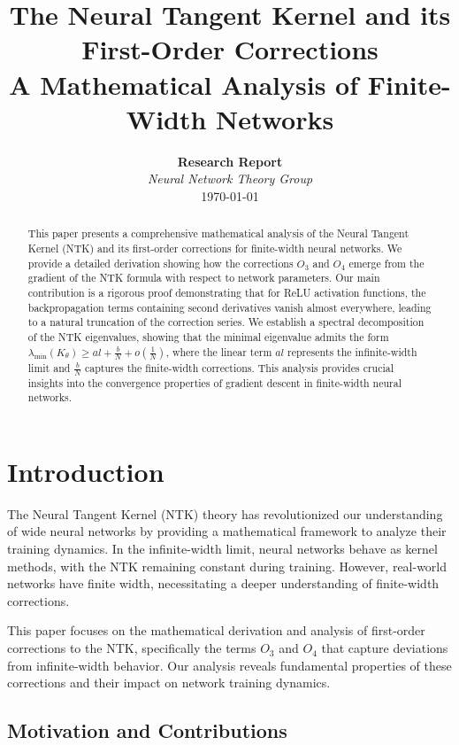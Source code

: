 \documentclass[11pt,a4paper]{article}
\title{\LARGE\textbf{The Neural Tangent Kernel and its First-Order Corrections}\\
\vspace{0.5cm}
\large A Mathematical Analysis of Finite-Width Networks}
\author{
\textbf{Research Report}\\
\vspace{0.3cm}
\textit{Neural Network Theory Group}\\
\vspace{0.2cm}
\today
}
\date{}
\theoremstyle{definition}
\begin{document}
\maketitle

\begin{abstract}
This paper presents a comprehensive mathematical analysis of the Neural Tangent Kernel (NTK) and its first-order corrections for finite-width neural networks. We provide a detailed derivation showing how the corrections $O_3$ and $O_4$ emerge from the gradient of the NTK formula with respect to network parameters. Our main contribution is a rigorous proof demonstrating that for ReLU activation functions, the backpropagation terms containing second derivatives vanish almost everywhere, leading to a natural truncation of the correction series. We establish a spectral decomposition of the NTK eigenvalues, showing that the minimal eigenvalue admits the form $\lambda_{\min}(K_\theta) \geq al + \frac{b}{N} + o(\frac{1}{N})$, where the linear term $al$ represents the infinite-width limit and $\frac{b}{N}$ captures the finite-width corrections. This analysis provides crucial insights into the convergence properties of gradient descent in finite-width neural networks.
\end{abstract}

\vspace{1cm}

\tableofcontents

\newpage

\section{Introduction}

The Neural Tangent Kernel (NTK) theory has revolutionized our understanding of wide neural networks by providing a mathematical framework to analyze their training dynamics. In the infinite-width limit, neural networks behave as kernel methods, with the NTK remaining constant during training. However, real-world networks have finite width, necessitating a deeper understanding of finite-width corrections.

This paper focuses on the mathematical derivation and analysis of first-order corrections to the NTK, specifically the terms $O_3$ and $O_4$ that capture deviations from infinite-width behavior. Our analysis reveals fundamental properties of these corrections and their impact on network training dynamics.

\subsection{Motivation and Contributions}
\end{document}

